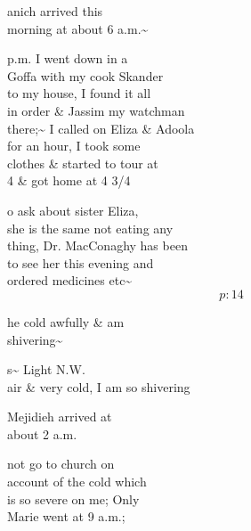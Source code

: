 \documentclass{report}
\begin{document}
	\par{
 	anich arrived this\ \\morning at about 6 a.m.\~{}\ \\
	}

	\par{
 	p.m. I went down in a\ \\Goffa with my cook Skander\ \\to my house, I found it all\ \\in order \& Jassim my watchman\ \\there;\~{} I called on Eliza \& Adoola\ \\for an hour, I took some\ \\clothes \& started to tour at\ \\4 \& got home at 4 3/4\ \\
	}

	\par{
 	o ask about sister Eliza,\ \\she is the same not eating any\ \\thing, Dr. MacConaghy has been\ \\to see her this evening and\ \\ordered medicines etc\~{}\ \\
  \[p: 14 \]

	}




	\par{
 	he cold awfully \& am\ \\shivering\~{}\ \\
	}


	\par{
 	s\~{} Light N.W.\ \\air \& very cold, I am so shivering\ \\
	}

	\par{
 	Mejidieh arrived at\ \\about 2 a.m.\ \\
	}

	\par{
 	not go to church on\ \\account of the cold which\ \\is so severe on me; Only\ \\Marie went at 9 a.m.;\ \\
	}
\end{document}
